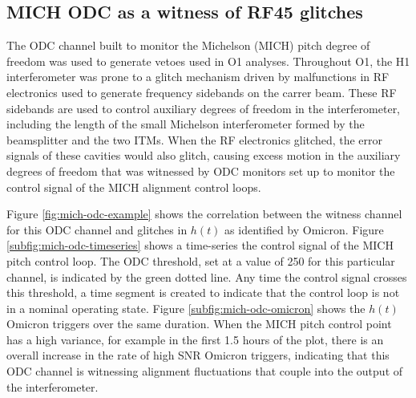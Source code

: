 \subsection{MICH ODC as a witness of RF45 glitches}

The ODC channel built to monitor the Michelson (MICH) pitch degree of freedom 
was used to generate vetoes used in O1 analyses. Throughout O1, the H1 
interferometer was prone to a glitch mechanism driven by malfunctions in 
RF electronics used to generate frequency sidebands on the carrer beam. 
These RF sidebands are used to control auxiliary degrees of freedom in the 
interferometer, including the length of the small Michelson interferometer 
formed by the beamsplitter and the two ITMs. When the RF electronics glitched, 
the error signals of these cavities would also glitch, causing excess motion 
in the auxiliary degrees of freedom that was witnessed by ODC monitors set 
up to monitor the control signal of the MICH alignment control loops. 

Figure \ref{fig:mich-odc-example} 
shows the correlation between the witness channel for this ODC channel 
and glitches in $h(t)$ as identified by Omicron. Figure \ref{subfig:mich-odc-timeseries} 
shows a time-series the control signal of the MICH pitch control loop. The ODC threshold, 
set at a value of 250 for this particular channel, is indicated by the green dotted 
line. Any time the control signal crosses this threshold, a time segment is created to 
indicate that the control loop is not in a nominal operating state. Figure 
\ref{subfig:mich-odc-omicron} shows the $h(t)$ Omicron triggers over the same 
duration. When the MICH pitch control point has a high variance, for example 
in the first 1.5 hours of the plot, there is an 
overall increase in the rate of high SNR Omicron triggers, indicating that 
this ODC channel is witnessing alignment fluctuations that couple into the 
output of the interferometer. 

